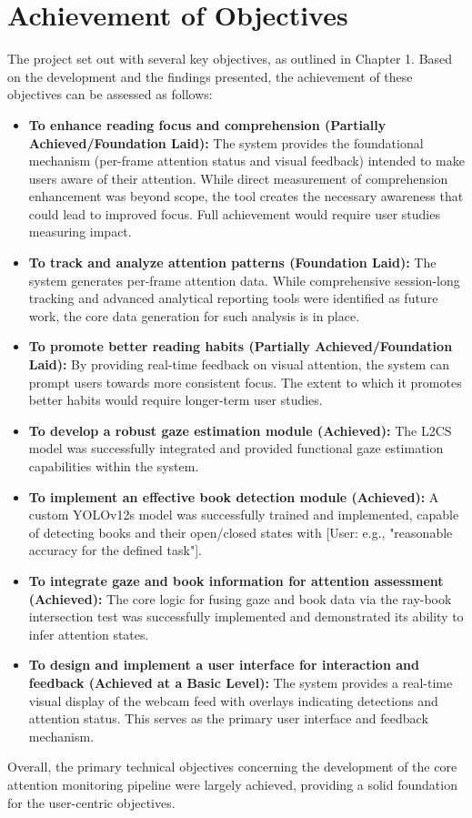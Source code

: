 \section{Achievement of Objectives}
The project set out with several key objectives, as outlined in Chapter 1. Based on the development and the findings presented, the achievement of these objectives can be assessed as follows:
\begin{itemize}
    \item \textbf{To enhance reading focus and comprehension (Partially Achieved/Foundation Laid):} The system provides the foundational mechanism (per-frame attention status and visual feedback) intended to make users aware of their attention. While direct measurement of comprehension enhancement was beyond scope, the tool creates the necessary awareness that could lead to improved focus. Full achievement would require user studies measuring impact.
    \item \textbf{To track and analyze attention patterns (Foundation Laid):} The system generates per-frame attention data. While comprehensive session-long tracking and advanced analytical reporting tools were identified as future work, the core data generation for such analysis is in place.
    \item \textbf{To promote better reading habits (Partially Achieved/Foundation Laid):} By providing real-time feedback on visual attention, the system can prompt users towards more consistent focus. The extent to which it promotes better habits would require longer-term user studies.
    \item \textbf{To develop a robust gaze estimation module (Achieved):} The L2CS model was successfully integrated and provided functional gaze estimation capabilities within the system.
    \item \textbf{To implement an effective book detection module (Achieved):} A custom YOLOv12s model was successfully trained and implemented, capable of detecting books and their open/closed states with [User: e.g., "reasonable accuracy for the defined task"].
    \item \textbf{To integrate gaze and book information for attention assessment (Achieved):} The core logic for fusing gaze and book data via the ray-book intersection test was successfully implemented and demonstrated its ability to infer attention states.
    \item \textbf{To design and implement a user interface for interaction and feedback (Achieved at a Basic Level):} The system provides a real-time visual display of the webcam feed with overlays indicating detections and attention status. This serves as the primary user interface and feedback mechanism.
\end{itemize}
Overall, the primary technical objectives concerning the development of the core attention monitoring pipeline were largely achieved, providing a solid foundation for the user-centric objectives.


